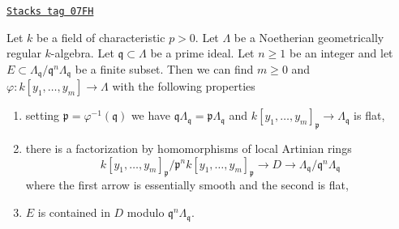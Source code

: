 \begin{lemma}
\label{smoothing-lemma-solution-modulo}
\href{https://stacks.math.columbia.edu/tag/07FH}{\texttt{Stacks tag 07FH}}

Let $k$ be a field of characteristic $p > 0$.
Let $\Lambda$ be a Noetherian geometrically regular $k$-algebra.
Let $\mathfrak q \subset \Lambda$ be a prime ideal.
Let $n \geq 1$ be an integer and let
$E \subset \Lambda_\mathfrak q/\mathfrak q^n\Lambda_\mathfrak q$
be a finite subset.
Then we can find $m \geq 0$ and
$\varphi : k[y_1, \ldots, y_m] \to \Lambda$ with the following properties
\begin{enumerate}
\item setting $\mathfrak p = \varphi^{-1}(\mathfrak q)$ we have
$\mathfrak q\Lambda_\mathfrak q = \mathfrak p \Lambda_\mathfrak q$
and $k[y_1, \ldots, y_m]_\mathfrak p \to \Lambda_\mathfrak q$ is flat,
\item there is a factorization by homomorphisms of local Artinian rings
$$
k[y_1, \ldots, y_m]_\mathfrak p/\mathfrak p^n k[y_1, \ldots, y_m]_\mathfrak p
\to D \to
\Lambda_\mathfrak q/\mathfrak q^n\Lambda_\mathfrak q
$$
where the first arrow is essentially smooth and the second is flat,
\item $E$ is contained in $D$ modulo $\mathfrak q^n\Lambda_\mathfrak q$.
\end{enumerate}
\end{lemma}


